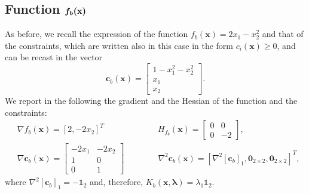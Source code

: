 \documentclass[a4paper,11pt]{article}
\begin{document}
\subsection*{Function $\boldmath{f_{b}}(\textbf{x})$}
As before, we recall the expression of the function $f_{b}(\textbf{x}) = 2x_{1} - x_{2}^{2}$ and that of the constraints, which are written also in this case in the form $c_{i}(\textbf{x})\ge0$, and can be recast in the vector
\begin{equation}
	\textbf{c}_{b}(\textbf{x}) = 
	\begin{bmatrix}
		1 -x_{1}^{2} - x_2^{2}\\
		x_1\\
		x_2
	\end{bmatrix}.
\end{equation}
We report in the following the gradient and the Hessian of the function and the constraints:
\begin{align}
	& \nabla f_{b}(\textbf{x}) = [2, -2x_{2}]^{T} \qquad \qquad \qquad \ \ H_{f_{b}}(\textbf{x}) = \begin{bmatrix}
		0 & 0 \\
		0 & -2
	\end{bmatrix}, \\
	& \nabla \textbf{c}_{b}(\textbf{x}) = \begin{bmatrix}
		-2x_{1} & - 2x_{2}\\
		1 & 0 \\
		0 & 1
	\end{bmatrix} \qquad \qquad \nabla^{2}{\textbf{c}_{b}}(\textbf{x}) =  \left[\nabla^{2}[\textbf{c}_{b}]_{1},\textbf{0}_{2\times2},\textbf{0}_{2\times2}\right]^{T},
\end{align}
where $\nabla^{2}[\textbf{c}_{b}]_{1} = -\mathbb{1}_{2}$ and, therefore, $K_{b}(\textbf{x},\boldsymbol{\lambda})=\lambda_{1}\mathbb{1}_{2}$.
%
%
%	
%
\end{document}
